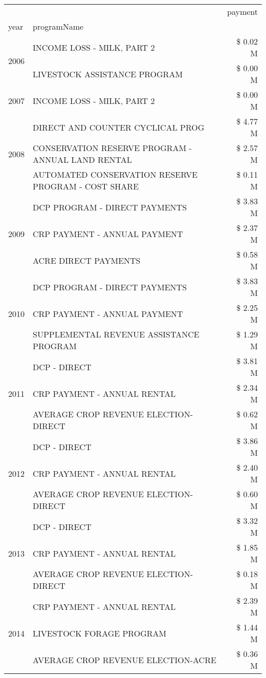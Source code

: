 \begin{tabular}{llr}
\toprule
 &  & payment \\
year & programName &  \\
\midrule
\multirow[t]{2}{*}{2006} & INCOME LOSS - MILK, PART 2 & \$ 0.02 M \\
 & LIVESTOCK ASSISTANCE PROGRAM & \$ 0.00 M \\
\cline{1-3}
2007 & INCOME LOSS - MILK, PART 2 & \$ 0.00 M \\
\cline{1-3}
\multirow[t]{3}{*}{2008} & DIRECT AND COUNTER CYCLICAL PROG & \$ 4.77 M \\
 & CONSERVATION RESERVE PROGRAM - ANNUAL LAND RENTAL & \$ 2.57 M \\
 & AUTOMATED CONSERVATION RESERVE PROGRAM - COST SHARE & \$ 0.11 M \\
\cline{1-3}
\multirow[t]{3}{*}{2009} & DCP PROGRAM - DIRECT PAYMENTS & \$ 3.83 M \\
 & CRP PAYMENT - ANNUAL PAYMENT & \$ 2.37 M \\
 & ACRE DIRECT PAYMENTS & \$ 0.58 M \\
\cline{1-3}
\multirow[t]{3}{*}{2010} & DCP PROGRAM - DIRECT PAYMENTS & \$ 3.83 M \\
 & CRP PAYMENT - ANNUAL PAYMENT & \$ 2.25 M \\
 & SUPPLEMENTAL REVENUE ASSISTANCE PROGRAM & \$ 1.29 M \\
\cline{1-3}
\multirow[t]{3}{*}{2011} & DCP - DIRECT & \$ 3.81 M \\
 & CRP PAYMENT - ANNUAL RENTAL & \$ 2.34 M \\
 & AVERAGE CROP REVENUE ELECTION-DIRECT & \$ 0.62 M \\
\cline{1-3}
\multirow[t]{3}{*}{2012} & DCP - DIRECT & \$ 3.86 M \\
 & CRP PAYMENT - ANNUAL RENTAL & \$ 2.40 M \\
 & AVERAGE CROP REVENUE ELECTION-DIRECT & \$ 0.60 M \\
\cline{1-3}
\multirow[t]{3}{*}{2013} & DCP - DIRECT & \$ 3.32 M \\
 & CRP PAYMENT - ANNUAL RENTAL & \$ 1.85 M \\
 & AVERAGE CROP REVENUE ELECTION-DIRECT & \$ 0.18 M \\
\cline{1-3}
\multirow[t]{3}{*}{2014} & CRP PAYMENT - ANNUAL RENTAL & \$ 2.39 M \\
 & LIVESTOCK FORAGE PROGRAM & \$ 1.44 M \\
 & AVERAGE CROP REVENUE ELECTION-ACRE & \$ 0.36 M \\

\end{tabular}
